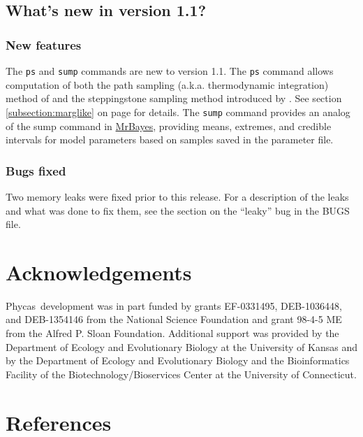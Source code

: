 \documentclass[10pt]{article}
\newcommand{\cmd}[1]{{\tt \small #1}\index{#1}}	%
\newcommand{\phycas}{{\sc Phycas}\index{Phycas}}
\newcommand{\mrbayesurl}{\href{http://mrbayes.sourceforge.net/}{{\sc MrBayes}}\index{MrBayes}}
\begin{document}
\subsection{What's new in version 1.1?} %
\subsubsection{New features}
The \cmd{ps} and \cmd{sump} commands are new to version 1.1. The \cmd{ps} command allows computation of both the path sampling (a.k.a. thermodynamic integration) method of \citet{LartillotPhillippe2006} and the steppingstone sampling method introduced by \citet{XieLewisFanKuoChen2010}. See section \ref{subsection:marglike} on page \pageref{subsection:marglike} for details. The \cmd{sump} command provides an analog of the sump command in \mrbayesurl, providing means, extremes, and credible intervals for model parameters based on samples saved in the parameter file.

\subsubsection{Bugs fixed}
Two memory leaks were fixed prior to this release. For a description of the leaks and what was done to fix them, see the section on the ``leaky'' bug in the BUGS file.

\section*{Acknowledgements}
\phycas\ development was in part funded by grants EF-0331495, DEB-1036448, and DEB-1354146 from the National Science Foundation and grant 98-4-5 ME from the Alfred P. Sloan Foundation. Additional support was provided by the Department of Ecology and Evolutionary Biology at the University of Kansas and by the Department of Ecology and Evolutionary Biology and the Bioinformatics Facility of the Biotechnology/Bioservices Center at the University of Connecticut.

\section*{References}
\renewcommand{\bibsection}{}


\clearpage
\printindex
\end{document}
